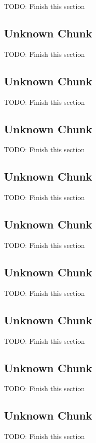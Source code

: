 TODO: Finish this section

\subsection{Unknown Chunk}
\label{subsec:pfmapcchunkcube}

TODO: Finish this section

\subsection{Unknown Chunk}
\label{subsec:pfmapcchunkdcal}

TODO: Finish this section

\subsection{Unknown Chunk}
\label{subsec:pfmapcchunkenv}

TODO: Finish this section

\subsection{Unknown Chunk}
\label{subsec:pfmapcchunklght}

TODO: Finish this section

\subsection{Unknown Chunk}
\label{subsec:pfmapcchunkprp2}

TODO: Finish this section

\subsection{Unknown Chunk}
\label{subsec:pfmapcchunkrive}

TODO: Finish this section

\subsection{Unknown Chunk}
\label{subsec:pfmapcchunkshex}

TODO: Finish this section

\subsection{Unknown Chunk}
\label{subsec:pfmapcchunktrn}

TODO: Finish this section

\subsection{Unknown Chunk}
\label{subsec:pfmapcchunkzon2}

TODO: Finish this section

\clearpage

